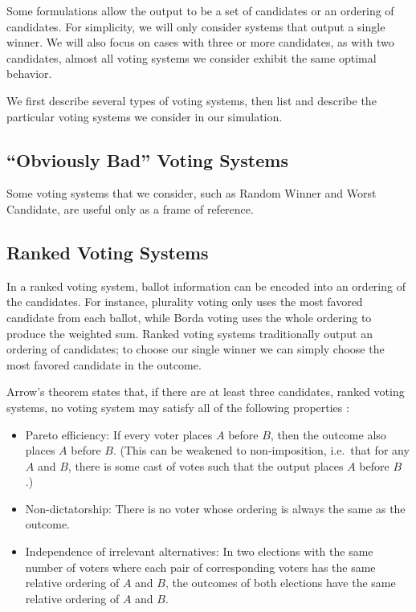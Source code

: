 \documentclass[11pt]{article}
\begin{document}
    Some formulations allow the output to be a set of candidates or an ordering of candidates.
    For simplicity, we will only consider systems that output a single winner.
    We will also focus on cases with three or more candidates, as with two candidates,
    almost all voting systems we consider exhibit the same optimal behavior.

    We first describe several types of voting systems,
    then list and describe the particular voting systems we consider in our simulation.

    \subsection{``Obviously Bad'' Voting Systems}\label{subsec:obviously-bad-voting-systems}

    Some voting systems that we consider, such as Random Winner and Worst Candidate,
    are useful only as a frame of reference.

    \subsection{Ranked Voting Systems}\label{subsec:ranked-voting-systems}

    In a ranked voting system, ballot information can be encoded into an ordering of the candidates.
    For instance, plurality voting only uses the most favored candidate from each ballot,
    while Borda voting uses the whole ordering to produce the weighted sum.
    Ranked voting systems traditionally output an ordering of candidates;
    to choose our single winner we can simply choose the most favored candidate in the outcome.

    Arrow's theorem states that, if there are at least three candidates,
    ranked voting systems, no voting system may satisfy all of the following properties \cite{Arrow}:

    \begin{itemize}
        \item Pareto efficiency:
        If every voter places $A$ before $B$, then the outcome also places $A$ before $B$.
        (This can be weakened to non-imposition,
        i.e.\ that for any $A$ and $B$, there is some cast of votes such that
        the output places $A$ before $B$ \cite{Wilson}.)
        \item Non-dictatorship:
        There is no voter whose ordering is always the same as the outcome.
        \item Independence of irrelevant alternatives:
        In two elections with the same number of voters where each pair of
        corresponding voters has the same relative ordering of $A$ and $B$,
        the outcomes of both elections have the same relative ordering of $A$ and $B$.
    \end{itemize}
\end{document}
